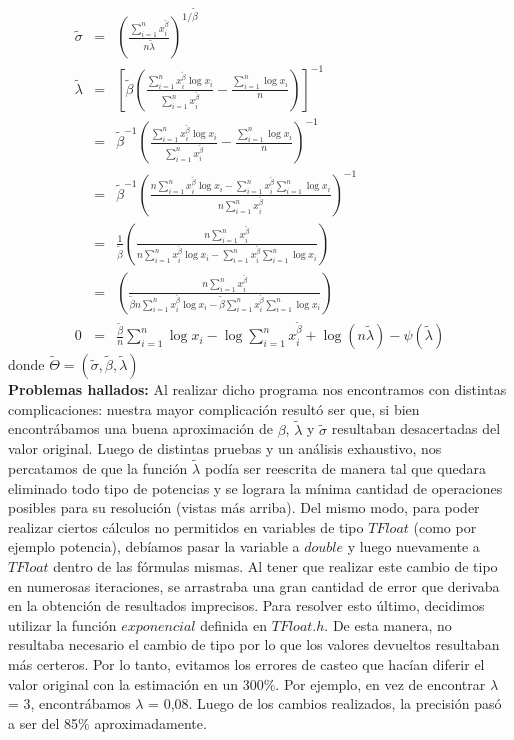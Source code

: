 \documentclass[10pt, a4paper]{article}
\begin{document}
\begin{eqnarray*}
\tilde{\sigma} & = & \left(\frac{\sum_{i=1}^n{x_i^{\tilde{\beta}}}}{n \tilde{\lambda}} \right)^{1/\tilde{\beta}}\\
\tilde{\lambda} & = &\left[ \tilde{\beta} \left( \frac{\sum_{i=1}^n{x_i^{\tilde{\beta}} \log x_i}}{\sum_{i=1}^n{x_i^{\tilde{\beta}}}} - \frac{\sum_{i=1}^n{\log x_i}}{n} \right)\right]^{-1}\\ 
{}& = & \tilde{\beta}^{-1} \left( \frac{\sum_{i=1}^n{x_i^{\tilde{\beta}} \log x_i}}{\sum_{i=1}^n{x_i^{\tilde{\beta}}}} - \frac{\sum_{i=1}^n{\log x_i}}{n}\right)^{-1}\\
{}& = & \tilde{\beta}^{-1} \left( \frac{n\sum_{i=1}^n{x_i^{\tilde{\beta}} \log x_i} - {\sum_{i=1}^n{x_i^{\tilde{\beta}}}}\sum_{i=1}^n\log x_i}{{n\sum_{i=1}^n{x_i^{\tilde{\beta}}}}}\right)^{-1}\\
{}& = & \frac{1}{\tilde{\beta}} \left( \frac{{n\sum_{i=1}^n{x_i^{\tilde{\beta}}}}}{n\sum_{i=1}^n{x_i^{\tilde{\beta}} \log x_i} - {\sum_{i=1}^n{x_i^{\tilde{\beta}}}}\sum_{i=1}^n\log x_i}\right)\\
{}& = & \left( \frac{{n\sum_{i=1}^n{x_i^{\tilde{\beta}}}}}{\tilde{\beta} n\sum_{i=1}^n{x_i^{\tilde{\beta}} \log x_i} - {\tilde{\beta}\sum_{i=1}^n{x_i^{\tilde{\beta}}}}\sum_{i=1}^n\log x_i}\right)\\
 0 & = & \frac{\tilde{\beta}}{n} \sum_{i=1}^n{\log x_i} - \log {\sum_{i=1}^n{x_i^{\tilde{\beta}}}} + \log(n \tilde{\lambda}) - \psi(\tilde{\lambda})
\end{eqnarray*}
donde $\tilde{\Theta}=(\tilde{\sigma},\tilde{\beta},\tilde{\lambda})$\\

\large{\textbf{Problemas hallados:}}
Al realizar dicho programa nos encontramos con distintas complicaciones: nuestra mayor complicaci\'on result\'o ser que, si bien encontr\'abamos una buena aproximaci\'on de $\beta$, $\tilde{\lambda}$ y $\tilde{\sigma}$ resultaban desacertadas del valor original.\newline 
Luego de distintas pruebas y un an\'alisis exhaustivo, nos percatamos de que la funci\'on $\tilde{\lambda}$ pod\'ia ser reescrita de manera tal que quedara eliminado todo tipo de potencias y se lograra la m\'inima cantidad de operaciones posibles para su resoluci\'on (vistas m\'as arriba). Del mismo modo, para poder realizar ciertos c\'alculos no permitidos en variables de tipo $TFloat$ (como por ejemplo potencia), deb\'iamos pasar la variable a $double$ y luego nuevamente a $TFloat$ dentro de las f\'ormulas mismas. Al tener que realizar este cambio de tipo en numerosas iteraciones, se arrastraba una gran cantidad de error que derivaba en la obtenci\'on de resultados imprecisos. Para resolver esto \'ultimo, decidimos utilizar la funci\'on $exponencial$ definida en $TFloat.h$. De esta manera, no resultaba necesario el cambio de tipo por lo que los valores devueltos resultaban m\'as certeros. Por lo tanto, evitamos los errores de casteo que hac\'ian diferir el valor original con la estimaci\'on en un 300$\%$. Por ejemplo, en vez de encontrar $\lambda$ = 3, encontr\'abamos $\lambda$ = 0,08. Luego de los cambios realizados, la precisi\'on pas\'o a ser del 85$\%$ aproximadamente.\newline
\end{document}
